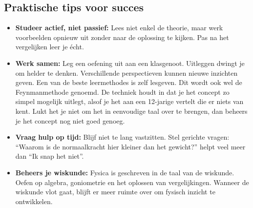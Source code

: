 \documentclass{ximera}
\begin{document}

 \subsection{Praktische tips voor succes}
  

\begin{itemize}
  \item \textbf{Studeer actief, niet passief:}  
  Lees niet enkel de theorie, maar werk voorbeelden opnieuw uit zonder naar de oplossing te kijken.  
  Pas na het vergelijken leer je écht.

  \item \textbf{Werk samen:}  
  Leg een oefening uit aan een klasgenoot. Uitleggen dwingt je om helder te denken.  
  Verschillende perspectieven kunnen nieuwe inzichten geven. Een van de beste leermethodes is zelf lesgeven. Dit wordt ook wel de Feynmanmethode genoemd. De techniek houdt in dat je het concept zo simpel mogelijk uitlegt, alsof je het aan een 12-jarige vertelt die er niets van kent. Lukt het je niet om het in eenvoudige taal over te brengen, dan beheers je het concept nog niet goed genoeg.
 
  \item \textbf{Vraag hulp op tijd:}  
  Blijf niet te lang vastzitten. Stel gerichte vragen:  
  “Waarom is de normaalkracht hier kleiner dan het gewicht?” helpt veel meer dan “Ik snap het niet”.

  \item \textbf{Beheers je wiskunde:}  
Fysica is geschreven in de taal van de wiskunde.
Oefen op algebra, goniometrie en het oplossen van vergelijkingen.
Wanneer de wiskunde vlot gaat, blijft er meer ruimte over om fysisch inzicht te ontwikkelen.


\end{itemize}
\end{document}
